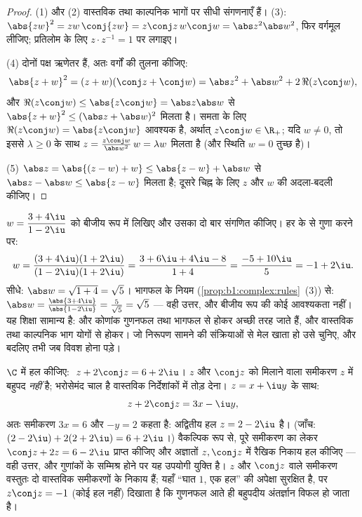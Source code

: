 \begin{proof}
(1) और (2) वास्तविक तथा काल्पनिक भागों पर सीधी संगणनाएँ हैं। (3):
$\abs{zw}^2 = zw\,\conj{zw} = z\conj z\, w \conj w = \abs z^2 \abs w^2$, फिर
वर्गमूल लीजिए; प्रतिलोम के लिए $z \cdot z^{-1} = 1$ पर लगाइए।

(4) दोनों पक्ष ऋणेतर हैं, अतः वर्गों की तुलना कीजिए:
\[
\abs{z+w}^2 = (z+w)(\conj z + \conj w)
= \abs z^2 + \abs w^2 + 2\,\Re(z \conj w),
\]
और $\Re(z\conj w) \leq \abs{z \conj w} = \abs z \abs w$ से $\abs{z+w}^2 \leq
(\abs z + \abs w)^2$ मिलता है। समता के लिए $\Re(z \conj w) = \abs{z \conj
w}$ आवश्यक है, अर्थात् $z \conj w \in \R_+$; यदि $w \neq 0$, तो इससे
$\lambda \geq 0$ के साथ $z = \frac{z\conj w}{\abs w^2}\, w = \lambda w$
मिलता है (और स्थिति $w = 0$ तुच्छ है)।

(5) $\abs z = \abs{(z - w) + w} \leq \abs{z-w} + \abs w$ से $\abs z - \abs w
\leq \abs{z - w}$ मिलता है; दूसरे चिह्न के लिए $z$ और $w$ की अदला-बदली
कीजिए।
\end{proof}

\begin{example}[मापांक और कोणांक का पूरा अभ्यास]\label{ex:b1:complex:workout}
$w = \dfrac{3 + 4\iu}{1 - 2\iu}$ को बीजीय रूप में लिखिए और उसका  दो
बार संगणित कीजिए। हर के  से गुणा करने पर:
\[
w = \frac{(3 + 4\iu)(1 + 2\iu)}{(1 - 2\iu)(1 + 2\iu)}
= \frac{3 + 6\iu + 4\iu - 8}{1 + 4}
= \frac{-5 + 10\iu}{5} = -1 + 2\iu .
\]
सीधे: $\abs w = \sqrt{1 + 4} = \sqrt5$। भागफल के नियम
(\cref{prop:b1:complex:rules}~(3)) से: $\abs w = \frac{\abs{3 +
4\iu}}{\abs{1 - 2\iu}} = \frac5{\sqrt5} = \sqrt5$ --- वही उत्तर, और बीजीय
रूप की कोई आवश्यकता नहीं। यह शिक्षा सामान्य है:  और कोणांक गुणनफल तथा
भागफल से होकर अच्छी तरह जाते हैं, और वास्तविक तथा काल्पनिक भाग योगों से
होकर। जो निरूपण सामने की संक्रियाओं से मेल खाता हो उसे चुनिए, और बदलिए तभी
जब विवश होना पड़े।
\end{example}

\begin{example}[संयुग्मी वाले समीकरण]\label{ex:b1:complex:conjeq}
$\C$ में हल कीजिए: $\;z + 2\conj z = 6 + 2\iu$। $z$ और $\conj z$ को मिलाने
वाला समीकरण $z$ में बहुपद \emph{नहीं} है; भरोसेमंद चाल है वास्तविक
निर्देशांकों में तोड़ देना। $z = x + \iu y$ के साथ:
\[
z + 2\conj z = 3x - \iu y ,
\]
अतः समीकरण $3x = 6$ और $-y = 2$ कहता है: अद्वितीय हल $z = 2 - 2\iu$ है।
(जाँच: $(2 - 2\iu) + 2(2 + 2\iu) = 6 + 2\iu$।) वैकल्पिक रूप से, पूरे समीकरण
का  लेकर $\conj z + 2z = 6 - 2\iu$ प्राप्त कीजिए और अज्ञातों $z,
\conj z$ में रैखिक निकाय हल कीजिए --- वही उत्तर, और गुणांकों के सम्मिश्र
होने पर यह उपयोगी युक्ति है। $z$ और $\conj z$ वाले समीकरण वस्तुतः दो
वास्तविक समीकरणों के निकाय हैं; यहाँ ``घात $1$, एक हल'' की अपेक्षा सुरक्षित
है, पर $z\conj z = -1$ (कोई हल नहीं) दिखाता है कि गुणनफल आते ही बहुपदीय
अंतर्ज्ञान विफल हो जाता है।
\end{example}

